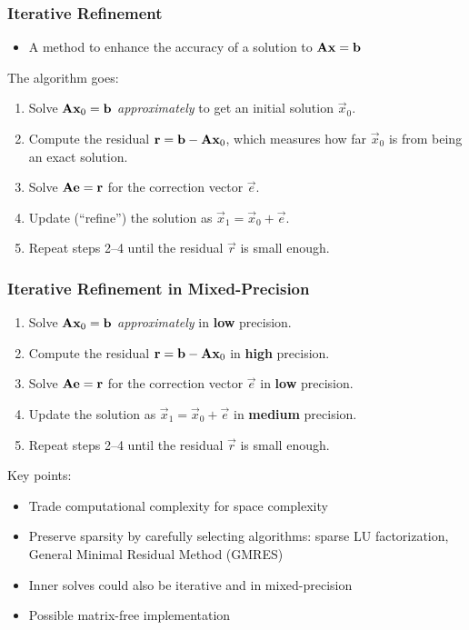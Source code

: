 \documentclass[t,12pt,numbers,fleqn]{beamer}
\begin{document}

\begin{frame}
\frametitle{Iterative Refinement}

\begin{itemize}
\item A method to enhance the accuracy of a solution to \(\mathbf{A}\mathbf{x} = \mathbf{b}\)
\end{itemize}

The algorithm goes:
\begin{enumerate}
\item Solve \(\mathbf{A}\mathbf{x}_0 = \mathbf{b}\) \emph{approximately} to get an initial solution \(\vec{x}_0\).
\item Compute the residual \(\mathbf{r} = \mathbf{b} - \mathbf{A}\mathbf{x}_0\), which measures how far \(\vec{x}_0\) is
  from being an exact solution.
\item Solve \(\mathbf{A}\mathbf{e} = \mathbf{r}\) for the correction vector \(\vec{e}\).
\item Update (``refine'') the solution as \(\vec{x}_1 = \vec{x}_0 + \vec{e}\).
\item Repeat steps 2--4 until the residual \(\vec{r}\) is small enough.
\end{enumerate}

\end{frame}


\begin{frame}
\frametitle{Iterative Refinement in Mixed-Precision}

\begin{enumerate}
\item Solve \(\mathbf{A}\mathbf{x}_0 = \mathbf{b}\) \emph{approximately} in \textbf{low} precision.
\item Compute the residual \(\mathbf{r} = \mathbf{b} - \mathbf{A}\mathbf{x}_0\) in \textbf{high} precision.
\item Solve \(\mathbf{A}\mathbf{e} = \mathbf{r}\) for the correction vector \(\vec{e}\) in \textbf{low} precision.
\item Update the solution as \(\vec{x}_1 = \vec{x}_0 + \vec{e}\) in \textbf{medium} precision.
\item Repeat steps 2--4 until the residual \(\vec{r}\) is small enough.
\end{enumerate}

Key points:

\begin{itemize}
\item Trade computational complexity for space complexity
\item Preserve sparsity by carefully selecting algorithms: sparse LU factorization,
  General Minimal Residual Method (GMRES)
\item Inner solves could also be iterative and in mixed-precision
\item Possible matrix-free implementation
\end{itemize}

\end{frame}
\end{document}
